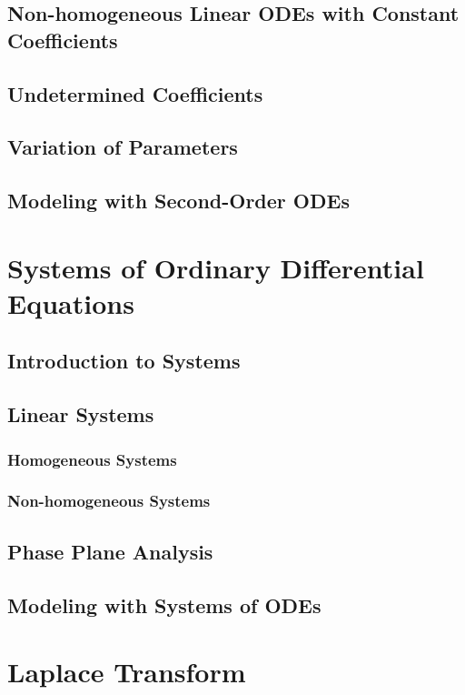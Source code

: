 \documentclass[11pt]{article}
\begin{document}
		\subsection{Non-homogeneous Linear ODEs with Constant Coefficients}
			\lipsum[1]
		\subsection{Undetermined Coefficients}
			\lipsum[1]
		\subsection{Variation of Parameters}
			\lipsum[1]
		\subsection{Modeling with Second-Order ODEs}
			\lipsum[1]
	\section{Systems of Ordinary Differential Equations}
		\lipsum[1]
		\subsection{Introduction to Systems}
			\lipsum[1]
		\subsection{Linear Systems}
			\lipsum[1]
			\subsubsection{Homogeneous Systems}
				\lipsum[1]
			\subsubsection{Non-homogeneous Systems}
				\lipsum[1]
		\subsection{Phase Plane Analysis}
			\lipsum[1]
		\subsection{Modeling with Systems of ODEs}
			\lipsum[1]
	\section{Laplace Transform}
		\lipsum[1]
\end{document}
